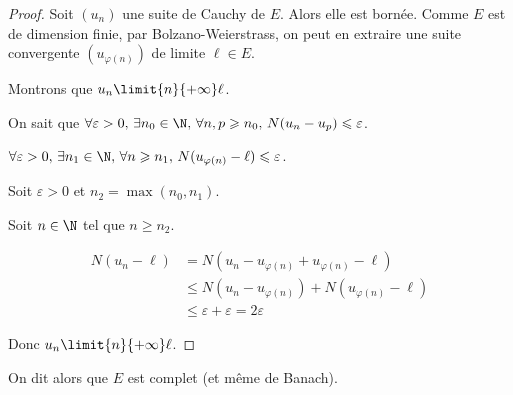 \begin{proof}
    Soit $(u_n)$ une suite de Cauchy de $E$. Alors elle est bornée. 
    Comme $E$ est de dimension finie, par Bolzano-Weierstrass, on peut en extraire
    une suite convergente $(u_{\varphi(n)})$ de limite $\ell \in E$.

    Montrons que $u_n \limit{n}{+\infty} \ell$.

    On sait que $\forall \varepsilon > 0, \, \exists n_0 \in \N, \, \forall n, p \geqslant n_0, \, N(u_n - u_p) \leqslant \varepsilon$. 

    $\forall \varepsilon > 0, \, \exists n_1 \in \N, \, \forall n \geqslant n_1, \, N(u_{\varphi(n)} - \ell) \leqslant \varepsilon$.

    Soit $\varepsilon > 0$ et $n_2 = \max(n_0, n_1)$.

    Soit $n \in \N$ tel que $n \geqslant n_2$.

    \begin{align*}
        N(u_n - \ell) & = N(u_n - u_{\varphi(n)} + u_{\varphi(n)} - \ell) \\
        & \leqslant N(u_n - u_{\varphi(n)}) + N(u_{\varphi(n)} - \ell) \\
        & \leqslant \varepsilon + \varepsilon = 2 \varepsilon
    \end{align*}

    Donc $u_n \limit{n}{+\infty} \ell$.
\end{proof}


\begin{remarque}
    On dit alors que $E$ est complet (et même de Banach).
\end{remarque}
